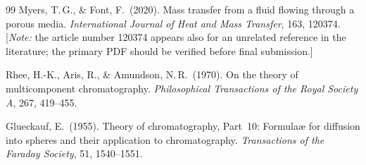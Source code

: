 \documentclass[a4paper]{amsart}
\theoremstyle{definition}
\begin{document}
\begin{thebibliography}{99}
Myers, T.\,G., \& Font, F.\ (2020).
Mass transfer from a fluid flowing through a porous media.
\textit{International Journal of Heat and Mass Transfer}, 163, 120374.
[\textit{Note:} the article number 120374 appears also for an unrelated
reference in the literature; the primary PDF should be verified before
final submission.]

Rhee, H.-K., Aris, R., \& Amundson, N.\,R.\ (1970).
On the theory of multicomponent chromatography.
\textit{Philosophical Transactions of the Royal Society A}, 267, 419--455.

Glueckauf, E.\ (1955).
Theory of chromatography, Part~10: Formula\ae{} for diffusion into spheres
  and their application to chromatography.
\textit{Transactions of the Faraday Society}, 51, 1540--1551.

\end{thebibliography}
\end{document}
